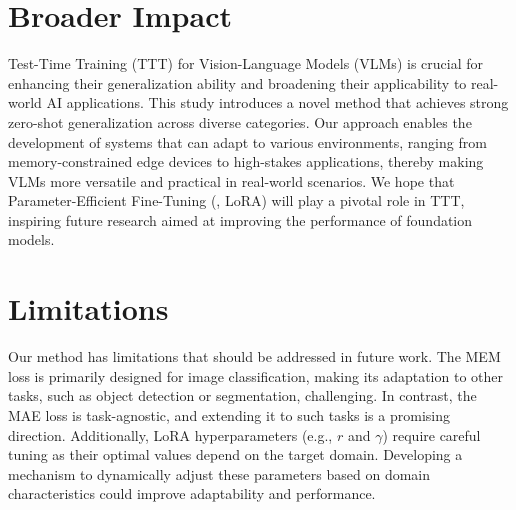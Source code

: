 \setcounter{page}{1}

\section{Broader Impact}
\label{sec:impact}
Test-Time Training (TTT) for Vision-Language Models (VLMs) is crucial for enhancing their generalization ability and broadening their applicability to real-world AI applications.
This study introduces a novel method that achieves strong zero-shot generalization across diverse categories.
Our approach enables the development of systems that can adapt to various environments, ranging from memory-constrained edge devices to high-stakes applications, thereby making VLMs more versatile and practical in real-world scenarios.
We hope that Parameter-Efficient Fine-Tuning (\eg, LoRA) will play a pivotal role in TTT, inspiring future research aimed at improving the performance of foundation models.

\section{Limitations}
Our method has limitations that should be addressed in future work.
The MEM loss is primarily designed for image classification, making its adaptation to other tasks, such as object detection or segmentation, challenging.
In contrast, the MAE loss is task-agnostic, and extending it to such tasks is a promising direction.
Additionally, LoRA hyperparameters (e.g., $r$ and $\gamma$) require careful tuning as their optimal values depend on the target domain.
Developing a mechanism to dynamically adjust these parameters based on domain characteristics could improve adaptability and performance.

